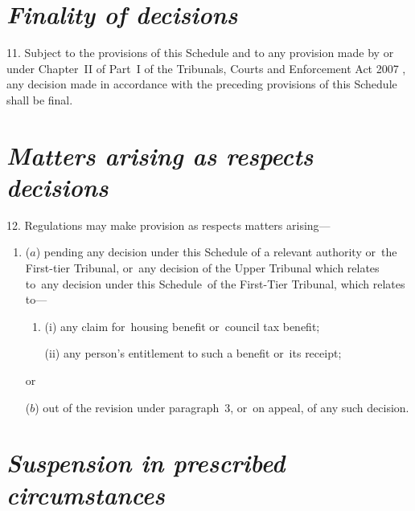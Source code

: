 \documentclass[12pt,a4paper]{article}
\begin{document}

\section*{\itshape Finality of decisions}

11. Subject to the provisions of this Schedule
and to any provision made by or under Chapter~II of Part~I of the Tribunals, Courts and Enforcement Act 2007%
, any decision made in accordance with the preceding provisions of this Schedule shall be final.


\section*{\itshape Matters arising as respects decisions}

12. Regulations may make provision as respects matters arising—
\begin{enumerate}\item[]
($a$) pending any decision under this Schedule of a relevant authority
or~the First-tier Tribunal, or~any decision of the Upper Tribunal which relates to~any decision under this Schedule~of the First-Tier Tribunal,  %
which relates to—
\begin{enumerate}\item[]
(i) any claim for~housing benefit or~council tax benefit;

(ii) any person’s entitlement to such a benefit or~its receipt;
\end{enumerate}
or

($b$) out of the revision under paragraph~3, or~on appeal, of any such decision.
\end{enumerate}


\section*{\itshape Suspension in prescribed circumstances}
\end{document}
